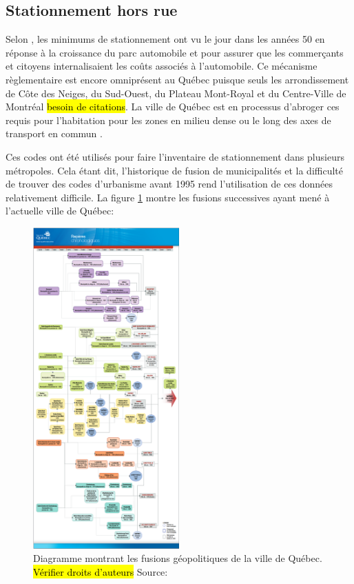 \subsection{Stationnement hors rue}
Selon \textcite{Shoup:HighCost:2005}, les minimums de stationnement ont vu le jour dans les années 50 en réponse à la croissance du parc automobile et pour assurer que les commerçants et citoyens internalisaient les coûts associés à l'automobile. Ce mécanisme règlementaire est encore omniprésent au Québec puisque seuls les arrondissement de Côte des Neiges, du Sud-Ouest, du Plateau Mont-Royal et du Centre-Ville de Montréal \hl{besoin de citations}. La ville de Québec est en processus d'abroger ces requis pour l'habitation pour les zones en milieu dense ou le long des axes de transport en commun \parencite{VilledeQuebec:AdoptionReglement:2024}.\par
Ces codes ont été utilisés pour faire l'inventaire de stationnement dans plusieurs métropoles. Cela étant dit, l'historique de fusion de municipalités et la difficulté de trouver des codes d'urbanisme avant 1995 rend l'utilisation de ces données relativement difficile. La figure \ref{fig:historique_fusions} montre les fusions successives ayant mené à l'actuelle ville de Québec:
\begin{figure}
  \centering
  \captionsetup{justification=centering,margin=2cm}
  \includegraphics[width = 0.5\textwidth]{images/historique_fusions_VDQ.png}
  \captionsetup{justification=centering,margin=2cm}
  \caption{Diagramme montrant les fusions géopolitiques de la ville de Québec. \hl{Vérifier droits d'auteurs} Source: \cite{VilledeQuebec:ReperesChronologique:}}
  \label{fig:historique_fusions}
\end{figure}



